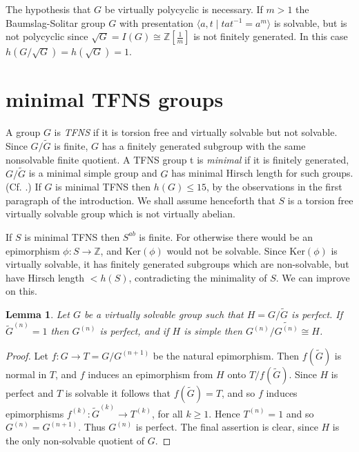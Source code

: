\documentclass[12pt]{amsart}
\renewcommand{\geq}{\geqslant}
\renewcommand{\leq}{\leqslant}
\newtheorem{lemma}[theorem]{Lemma}
\begin{document}
The hypothesis that $G$ be virtually polycyclic is necessary.
If $m>1$ the Baumslag-Solitar group $G$ with presentation
$\langle{a,t}\mid{tat^{-1}=a^m}\rangle$ is solvable,
but is not polycyclic since
$\sqrt{G}=I(G)\cong\mathbb{Z}[\frac1m]$ is not finitely generated.
In this case $h(G/\sqrt{G})=h(\sqrt{G})=1$.

\section{minimal TFNS groups}

A group $G$ is {\it TFNS\/} if it is torsion free and virtually solvable but not solvable.
Since $G/\widetilde{G}$ is finite, 
$G$ has a finitely generated subgroup with the same
nonsolvable finite quotient.
A TFNS group t is {\it minimal\/} if it is finitely generated,  
$G/\widetilde{G}$ is a minimal simple group and $G$
has minimal Hirsch length for such groups.
(Cf. \cite[Definition 2.1]{LuS}.)
If $G$ is minimal TFNS then $h(G)\leq15$,
by the observations in the first paragraph of the introduction.
We shall assume henceforth that $S$ is a torsion free virtually solvable group
which is not virtually abelian.

If  $S$ is minimal TFNS then $S^{ab}$ is finite.
For otherwise there would be an epimorphism $\phi:S\to\mathbb{Z}$, 
and $\mathrm{Ker}(\phi)$ would not be solvable.
Since $\mathrm{Ker}(\phi)$ is virtually solvable, 
it has finitely generated subgroups which are non-solvable,  
but have Hirsch length $<h(S)$,
contradicting the minimality of $S$.
We can improve on this.

\begin{lemma}
\label{perf}
Let $G$ be a virtually solvable group such that $H=G/\widetilde{G}$ is perfect.
If $\widetilde{G}^{(n)}=1$ then $G^{(n)}$ is perfect,
and if $H$ is simple then $G^{(n)}/\widetilde{G^{(n)}}\cong{H}$.
\end{lemma}

\begin{proof}
Let $f:G\to{T}=G/G^{(n+1)}$ be the natural epimorphism.
Then $f(\widetilde{G})$ is normal in $T$,
and $f$ induces an epimorphism from $H$ onto $T/f(\widetilde{G})$.
Since $H$ is perfect and $T$ is solvable it follows that $f(\widetilde{G})=T$,
and so $f$ induces epimorphisms $f^{(k)}:\widetilde{G}^{(k)}\to{T^{(k)}}$, 
for all $k\geq1$.
Hence $T^{(n)}=1$ and so $G^{(n)}=G^{(n+1)}$.
Thus $G^{(n)}$ is perfect.
The final assertion is clear, 
since $H$ is the only non-solvable quotient of $G$.
\end{proof}
\end{document}

